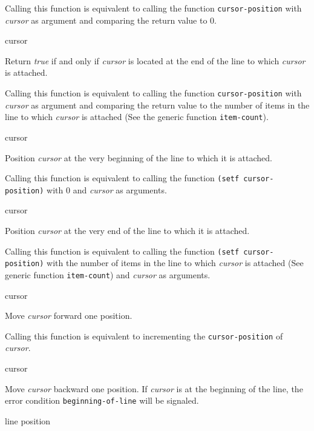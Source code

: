Calling this function is equivalent to calling the function
\texttt{cursor-position} with \textit{cursor} as argument and
comparing the return value to $0$.  \howeverperformance{}

 {cursor}

Return \textit{true} if and only if \textit{cursor} is located at the
end of the line to which \textit{cursor} is attached.

\ifdetached{}

Calling this function is equivalent to calling the function
\texttt{cursor-position} with \textit{cursor} as argument and
comparing the return value to the number of items in the line to which
\textit{cursor} is attached (See the generic function
\texttt{item-count}).  \howeverperformance{}

 {cursor}

Position \textit{cursor} at the very beginning of the line to which it
is attached.

\ifdetached{}

Calling this function is equivalent to calling the function
\texttt{(setf cursor-position)} with $0$ and \textit{cursor} as
arguments.  \howeverperformance{}

 {cursor}

Position \textit{cursor} at the very end of the line to which it
is attached.

\ifdetached{}

Calling this function is equivalent to calling the function
\texttt{(setf cursor-position)} with the number of items in the line
to which \textit{cursor} is attached (See generic function
\texttt{item-count}) and \textit{cursor} as arguments.
\howeverperformance{}

 {cursor}

Move \textit{cursor} forward one position.

\ifdetached{}

Calling this function is equivalent to incrementing the
\texttt{cursor-position} of \textit{cursor}.  \howeverperformance{}

 {cursor}

Move \textit{cursor} backward one position.  If \emph{cursor} is at
the beginning of the line, the error condition
\texttt{beginning-of-line} will be signaled.

 {line position}

